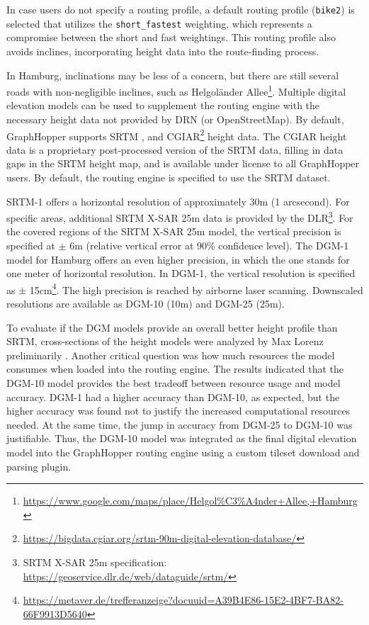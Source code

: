 In case users do not specify a routing profile, a default routing profile (\texttt{bike2}) is selected that utilizes the \texttt{short\_fastest} weighting, which represents a compromise between the short and fast weightings. This routing profile also avoids inclines, incorporating height data into the route-finding process.

In Hamburg, inclinations may be less of a concern, but there are still several roads with non-negligible inclines, such as Helgoländer Allee\footnote{\url{https://www.google.com/maps/place/Helgol\%C3\%A4nder+Allee,+Hamburg}}. Multiple digital elevation models can be used to supplement the routing engine with the necessary height data not provided by DRN (or OpenStreetMap). By default, GraphHopper supports SRTM \cite{farr_shuttle_2000, farr_shuttle_2007}, and CGIAR\footnote{\url{https://bigdata.cgiar.org/srtm-90m-digital-elevation-database/}} height data. The CGIAR height data is a proprietary post-processed version of the SRTM data, filling in data gaps in the SRTM height map, and is available under license to all GraphHopper users. By default, the routing engine is specified to use the SRTM dataset.

SRTM-1 offers a horizontal resolution of approximately 30m (1 arcsecond). For specific areas, additional SRTM X-SAR 25m data is provided by the DLR\footnote{SRTM X-SAR 25m specification: \url{https://geoservice.dlr.de/web/dataguide/srtm/}}. For the covered regions of the SRTM X-SAR 25m model, the vertical precision is specified at $\pm$ 6m (relative vertical error at 90\% confidence level). The DGM-1 model for Hamburg offers an even higher precision, in which the one stands for one meter of horizontal resolution. In DGM-1, the vertical resolution is specified as $\pm$ 15cm\footnote{\url{https://metaver.de/trefferanzeige?docuuid=A39B4E86-15E2-4BF7-BA82-66F9913D5640}}. The high precision is reached by airborne laser scanning. Downscaled resolutions are available as DGM-10 (10m) and DGM-25 (25m).

To evaluate if the DGM models provide an overall better height profile than SRTM, cross-sections of the height models were analyzed by Max Lorenz preliminarily \cite{lorenz_2022}. Another critical question was how much resources the model consumes when loaded into the routing engine. The results indicated that the DGM-10 model provides the best tradeoff between resource usage and model accuracy. DGM-1 had a higher accuracy than DGM-10, as expected, but the higher accuracy was found not to justify the increased computational resources needed. At the same time, the jump in accuracy from DGM-25 to DGM-10 was justifiable. Thus, the DGM-10 model was integrated as the final digital elevation model into the GraphHopper routing engine using a custom tileset download and parsing plugin.

